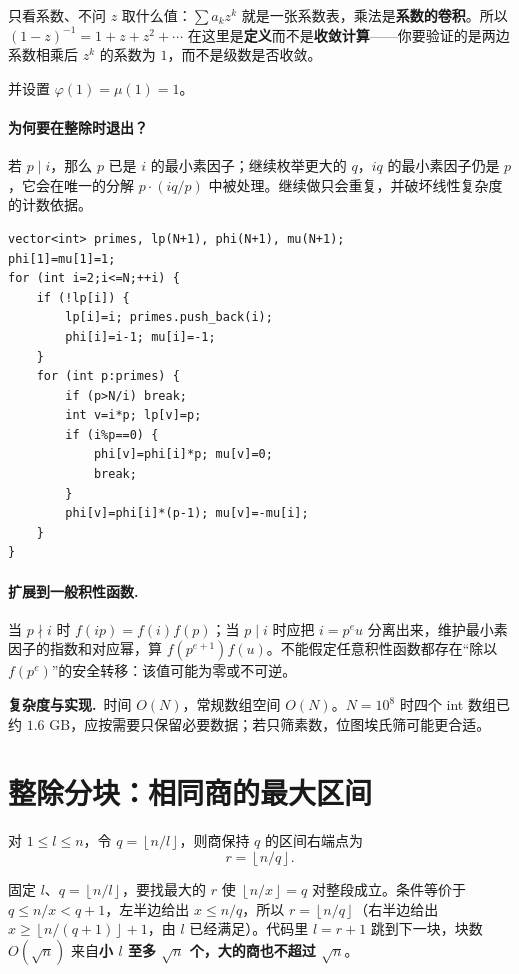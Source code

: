 \documentclass[UTF8,a4paper,11pt,twoside,openright,fontset=fandol]{ctexbook}
\theoremstyle{definition}
\newcommand{\floor}[1]{\left\lfloor #1\right\rfloor}
\newcommand{\cost}{\par\noindent\textbf{复杂度与实现.}\ }
\begin{document}
\begin{tip}
只看系数、不问 $z$ 取什么值：$\sum a_kz^k$ 就是一张系数表，乘法是\textbf{系数的卷积}。所以 $(1-z)^{-1}=1+z+z^2+\cdots$ 在这里是\textbf{定义}而不是\textbf{收敛计算}——你要验证的是两边系数相乘后 $z^k$ 的系数为 $1$，而不是级数是否收敛。
\end{tip}

并设置 $\varphi(1)=\mu(1)=1$。


\paragraph{为何要在整除时退出？}
若 $p\mid i$，那么 $p$ 已是 $i$ 的最小素因子；继续枚举更大的 $q$，$iq$ 的最小素因子仍是 $p$，它会在唯一的分解 $p\cdot(iq/p)$ 中被处理。继续做只会重复，并破坏线性复杂度的计数依据。
\begin{lstlisting}
vector<int> primes, lp(N+1), phi(N+1), mu(N+1);
phi[1]=mu[1]=1;
for (int i=2;i<=N;++i) {
    if (!lp[i]) {
        lp[i]=i; primes.push_back(i);
        phi[i]=i-1; mu[i]=-1;
    }
    for (int p:primes) {
        if (p>N/i) break;
        int v=i*p; lp[v]=p;
        if (i%p==0) {
            phi[v]=phi[i]*p; mu[v]=0;
            break;
        }
        phi[v]=phi[i]*(p-1); mu[v]=-mu[i];
    }
}
\end{lstlisting}
\paragraph{扩展到一般积性函数.} 当 $p\nmid i$ 时 $f(ip)=f(i)f(p)$；当 $p\mid i$ 时应把 $i=p^e u$ 分离出来，维护最小素因子的指数和对应幂，算 $f(p^{e+1})f(u)$。不能假定任意积性函数都存在“除以 $f(p^e)$”的安全转移：该值可能为零或不可逆。
\cost 时间 $O(N)$，常规数组空间 $O(N)$。$N=10^8$ 时四个 int 数组已约 $1.6$ GB，应按需要只保留必要数据；若只筛素数，位图埃氏筛可能更合适。


\section{整除分块：相同商的最大区间}
对 $1\le l\le n$，令 $q=\floor{n/l}$，则商保持 $q$ 的区间右端点为
\[
 r=\floor{n/q}.
\]

\begin{tip}[$r=\floor{n/q}$ 是怎么想到的]
固定 $l$、$q=\floor{n/l}$，要找最大的 $r$ 使 $\floor{n/x}=q$ 对整段成立。条件等价于 $q\le n/x<q+1$，左半边给出 $x\le n/q$，所以 $r=\floor{n/q}$（右半边给出 $x\ge\floor{n/(q+1)}+1$，由 $l$ 已经满足）。代码里 $l=r+1$ 跳到下一块，块数 $O(\sqrt n)$ 来自\textbf{小 $l$ 至多 $\sqrt n$ 个，大的商也不超过 $\sqrt n$}。
\end{tip}
\end{document}
